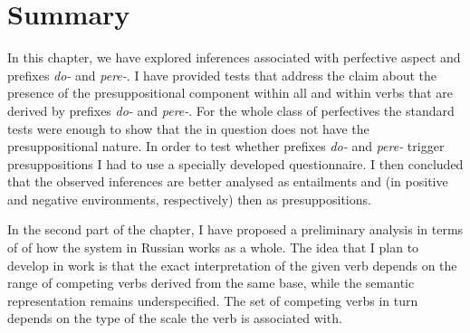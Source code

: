 \section{Summary}
In this chapter, we have explored inferences associated with perfective aspect and prefixes \textit{do-} and \textit{pere-}. I have provided tests that address the claim about the presence of the presuppositional component within all  and within verbs that are derived by prefixes \textit{do-} and \textit{pere-}. For the whole class of perfectives the standard tests were enough to show that the  in question does not have the presuppositional nature. In order to test whether prefixes \textit{do-} and \textit{pere-} trigger presuppositions I had to use a specially developed questionnaire. I then concluded that the observed inferences are better analysed as entailments and  (in positive and negative environments, respectively) then as presuppositions.

In the second part of the chapter, I have proposed a preliminary analysis in terms of  of how the  system in Russian works as a whole. The idea that I plan to develop in  work is that the exact interpretation of the given verb depends on the range of competing verbs derived from the same base, while the semantic representation remains underspecified. The set of competing verbs in turn depends on the type of the scale the verb is associated with.



